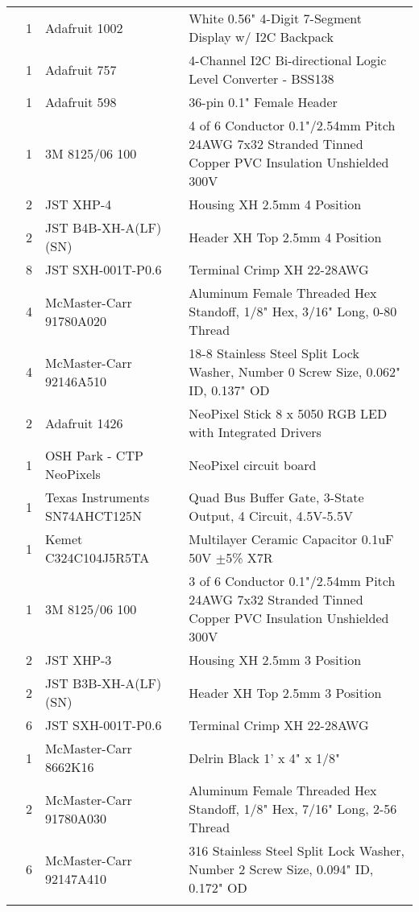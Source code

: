 \begin{longtabu}{X[3,c,m] X[1,c,m] X[3,c,m] X[5,l,m]}
   & 1 & Adafruit 1002 & White 0.56" 4-Digit 7-Segment Display w/ I2C Backpack \\
  & 1 & Adafruit 757 & 4-Channel I2C Bi-directional Logic Level Converter - BSS138 \\
  & 1 & Adafruit 598 & 36-pin 0.1" Female Header \\
  & 1 & 3M 8125/06 100 & 4 of 6 Conductor 0.1"/2.54mm Pitch 24AWG 7x32 Stranded Tinned Copper PVC Insulation Unshielded 300V \\
  & 2 & JST XHP-4 & Housing XH 2.5mm 4 Position \\
  & 2 & JST B4B-XH-A(LF)(SN) & Header XH Top 2.5mm 4 Position \\
  & 8 & JST SXH-001T-P0.6 & Terminal Crimp XH 22-28AWG \\
  & 4 & McMaster-Carr 91780A020 & Aluminum Female Threaded Hex Standoff, 1/8" Hex, 3/16" Long, 0-80 Thread \\
  & 4 & McMaster-Carr 92146A510 & 18-8 Stainless Steel Split Lock Washer, Number 0 Screw Size, 0.062" ID, 0.137" OD \\ \mrule

   & 2 & Adafruit 1426 & NeoPixel Stick 8 x 5050 RGB LED with Integrated Drivers \\
  & 1 & OSH Park - CTP NeoPixels & NeoPixel circuit board \\
  & 1 & Texas Instruments SN74AHCT125N & Quad Bus Buffer Gate, 3-State Output, 4 Circuit, 4.5V-5.5V \\
  & 1 & Kemet C324C104J5R5TA & Multilayer Ceramic Capacitor 0.1uF 50V $\pm$5\% X7R \\
  & 1 & 3M 8125/06 100 & 3 of 6 Conductor 0.1"/2.54mm Pitch 24AWG 7x32 Stranded Tinned Copper PVC Insulation Unshielded 300V \\
  & 2 & JST XHP-3 & Housing XH 2.5mm 3 Position \\
  & 2 & JST B3B-XH-A(LF)(SN) & Header XH Top 2.5mm 3 Position \\
  & 6 & JST SXH-001T-P0.6 & Terminal Crimp XH 22-28AWG \\
  & 1 & McMaster-Carr 8662K16 & Delrin Black 1' x 4" x 1/8" \\
  & 2 & McMaster-Carr 91780A030 & Aluminum Female Threaded Hex Standoff, 1/8" Hex, 7/16" Long, 2-56 Thread \\
  & 6 & McMaster-Carr 92147A410 & 316 Stainless Steel Split Lock Washer, Number 2 Screw Size, 0.094" ID, 0.172" OD \\ \mrule


\end{longtabu}
